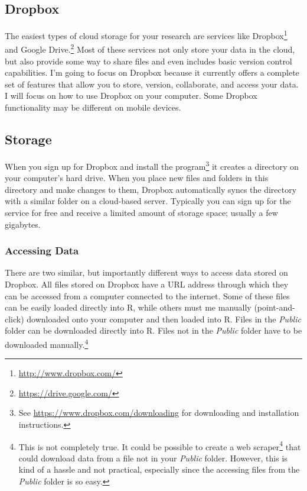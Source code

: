 \subsection{Dropbox}

The easiest types of cloud storage for your research are services like Dropbox\footnote{\url{http://www.dropbox.com/}} and Google  Drive.\footnote{\url{https://drive.google.com/}} Most of these services not only store your data in the cloud, but also provide some way to share files and even includes basic version control capabilities. I'm going to focus on Dropbox because it currently offers a complete set of features that allow you to store, version, collaborate, and access your data. I will focus on how to use Dropbox on your computer. Some Dropbox functionality may be different on mobile devices.

\subsection{Storage}

When you sign up for Dropbox and install the program\footnote{See \url{https://www.dropbox.com/downloading} for downloading and installation instructions.} it creates a directory on your computer's hard drive. When you place new files and folders in this directory and make changes to them, Dropbox automatically syncs the directory with a similar folder on a cloud-based server. Typically you can sign up for the service for free and receive a limited amount of storage space; usually a few gigabytes.

\subsubsection{Accessing Data}

There are two similar, but importantly different ways to access data stored on Dropbox. All files stored on Dropbox have a URL address through which they can be accessed from a computer connected to the internet. Some of these files can be easily loaded directly into R, while others must me manually (point-and-click) downloaded onto your computer and then loaded into R. Files in the \emph{Public} folder can be downloaded directly into R. Files not in the \emph{Public} folder have to be downloaded  manually.\footnote{This is not completely true. It could be possible to create a web scraper\footnote{web scraper} that could download data from a file not in your \emph{Public} folder. However, this is kind of a hassle and not practical, especially since the accessing files from the \emph{Public} folder is so easy.}

